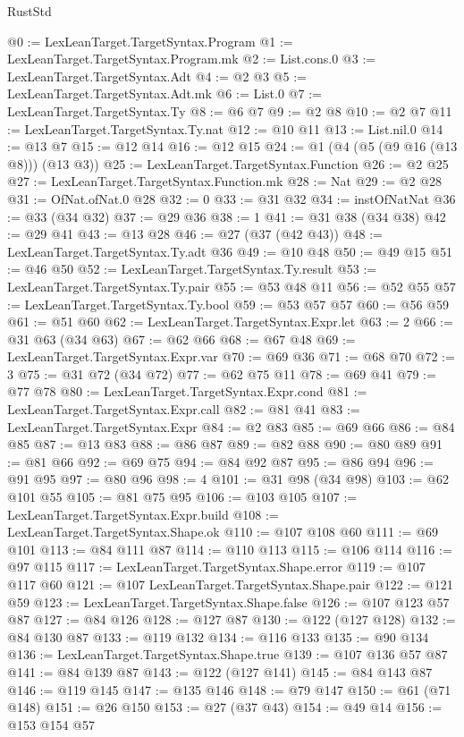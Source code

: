 \begin{lexlean}{RustStd}
\begin{coremodule}
@0 := LexLeanTarget.TargetSyntax.Program
@1 := LexLeanTarget.TargetSyntax.Program.mk
@2 := List.cons.{0}
@3 := LexLeanTarget.TargetSyntax.Adt
@4 := @2 @3
@5 := LexLeanTarget.TargetSyntax.Adt.mk
@6 := List.{0}
@7 := LexLeanTarget.TargetSyntax.Ty
@8 := @6 @7
@9 := @2 @8
@10 := @2 @7
@11 := LexLeanTarget.TargetSyntax.Ty.nat
@12 := @10 @11
@13 := List.nil.{0}
@14 := @13 @7
@15 := @12 @14
@16 := @12 @15
@24 := @1 (@4 (@5 (@9 @16 (@13 @8))) (@13 @3))
@25 := LexLeanTarget.TargetSyntax.Function
@26 := @2 @25
@27 := LexLeanTarget.TargetSyntax.Function.mk
@28 := Nat
@29 := @2 @28
@31 := OfNat.ofNat.{0} @28
@32 := 0
@33 := @31 @32
@34 := instOfNatNat
@36 := @33 (@34 @32)
@37 := @29 @36
@38 := 1
@41 := @31 @38 (@34 @38)
@42 := @29 @41
@43 := @13 @28
@46 := @27 (@37 (@42 @43))
@48 := LexLeanTarget.TargetSyntax.Ty.adt @36
@49 := @10 @48
@50 := @49 @15
@51 := @46 @50
@52 := LexLeanTarget.TargetSyntax.Ty.result
@53 := LexLeanTarget.TargetSyntax.Ty.pair
@55 := @53 @48 @11
@56 := @52 @55
@57 := LexLeanTarget.TargetSyntax.Ty.bool
@59 := @53 @57 @57
@60 := @56 @59
@61 := @51 @60
@62 := LexLeanTarget.TargetSyntax.Expr.let
@63 := 2
@66 := @31 @63 (@34 @63)
@67 := @62 @66
@68 := @67 @48
@69 := LexLeanTarget.TargetSyntax.Expr.var
@70 := @69 @36
@71 := @68 @70
@72 := 3
@75 := @31 @72 (@34 @72)
@77 := @62 @75 @11
@78 := @69 @41
@79 := @77 @78
@80 := LexLeanTarget.TargetSyntax.Expr.cond
@81 := LexLeanTarget.TargetSyntax.Expr.call
@82 := @81 @41
@83 := LexLeanTarget.TargetSyntax.Expr
@84 := @2 @83
@85 := @69 @66
@86 := @84 @85
@87 := @13 @83
@88 := @86 @87
@89 := @82 @88
@90 := @80 @89
@91 := @81 @66
@92 := @69 @75
@94 := @84 @92 @87
@95 := @86 @94
@96 := @91 @95
@97 := @80 @96
@98 := 4
@101 := @31 @98 (@34 @98)
@103 := @62 @101 @55
@105 := @81 @75 @95
@106 := @103 @105
@107 := LexLeanTarget.TargetSyntax.Expr.build
@108 := LexLeanTarget.TargetSyntax.Shape.ok
@110 := @107 @108 @60
@111 := @69 @101
@113 := @84 @111 @87
@114 := @110 @113
@115 := @106 @114
@116 := @97 @115
@117 := LexLeanTarget.TargetSyntax.Shape.error
@119 := @107 @117 @60
@121 := @107 LexLeanTarget.TargetSyntax.Shape.pair
@122 := @121 @59
@123 := LexLeanTarget.TargetSyntax.Shape.false
@126 := @107 @123 @57 @87
@127 := @84 @126
@128 := @127 @87
@130 := @122 (@127 @128)
@132 := @84 @130 @87
@133 := @119 @132
@134 := @116 @133
@135 := @90 @134
@136 := LexLeanTarget.TargetSyntax.Shape.true
@139 := @107 @136 @57 @87
@141 := @84 @139 @87
@143 := @122 (@127 @141)
@145 := @84 @143 @87
@146 := @119 @145
@147 := @135 @146
@148 := @79 @147
@150 := @61 (@71 @148)
@151 := @26 @150
@153 := @27 (@37 @43)
@154 := @49 @14
@156 := @153 @154 @57

\end{coremodule}
\end{lexlean}
